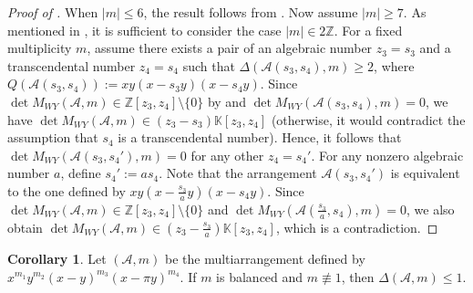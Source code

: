 \documentclass[12pt]{amsart}
\theoremstyle{definition}
\newtheorem{corollary}[definition]{Corollary}
\newcommand{\ZZ}{\mathbb{Z}}
\newcommand{\KK}{\mathbb{K}}
\newcommand{\AAA}{\mathcal{A}}
\begin{document}
\begin{proof}[Proof of ]
    When $|m|\leq6$, the result follows from . 
    Now assume $|m|\geq7$. 
    As mentioned in , 
    it is sufficient to consider the case $|m|\in2\ZZ$. 
    For a fixed multiplicity $m$, %
    assume there exists a pair of 
    an algebraic number $z_3=s_3$ and a transcendental number $z_4=s_4$ 
    such that $\Delta(\AAA({s_3,s_4}),m)\geq2$, 
    where $Q(\AAA({s_3,s_4})):=xy(x-s_3y)(x-s_4y)$. 
    Since $\det M_{WY}(\AAA,m)\in \ZZ[z_3,z_4]\setminus\{0\}$ 
    by 
    and $\det M_{WY}(\AAA({s_3,s_4}),m)=0$, 
    we have $\det M_{WY}(\AAA,m)\in(z_3-s_3)\KK[z_3,z_4]$ 
    (otherwise, it would contradict the assumption that $s_4$ is a transcendental number). 
    Hence, it follows that $\det M_{WY}(\AAA({s_3,s_4'}),m)=0$ 
    for any other $z_4=s_4'$. 
    For any nonzero algebraic number $a$, define $s_4':=as_4$. 
    Note that 
    the arrangement $\AAA({s_3,s_4'})$ is equivalent to 
    the one defined by $xy(x-\frac{s_3}{a}y)(x-s_4y)$. 
    Since $\det M_{WY}(\AAA,m)\in \ZZ[z_3,z_4]\setminus\{0\}$ and 
    $\det M_{WY}(\AAA(\frac{s_3}{a},s_4),m)=0$, 
    we also obtain $\det M_{WY}(\AAA,m)\in(z_3-\frac{s_3}{a})\KK[z_3,z_4]$, 
    which is a contradiction. 
    \end{proof}
%

\begin{corollary}\label{corollary: no peak points_pi}
Let $(\AAA,m)$ be the multiarrangement defined by 
$x^{m_1}y^{m_2}(x-y)^{m_3}(x-\pi y)^{m_4}$. 
If $m$ is balanced and $m\not\equiv 1$, then $\Delta(\AAA,m)\leq1$. 
\end{corollary}
\end{document}
